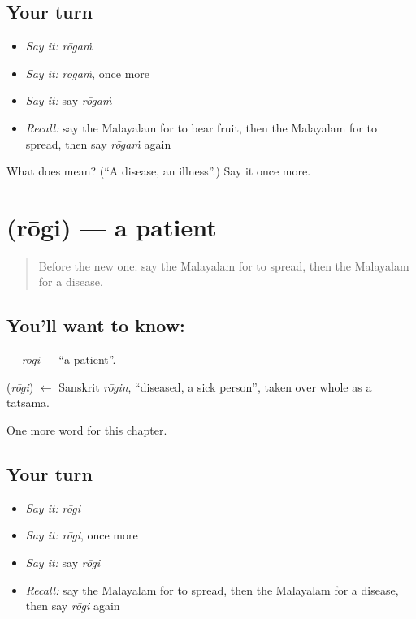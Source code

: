 \subsection*{Your turn}
\begin{itemize}
\raggedright
  \item \emph{Say it:} \emph{rōgaṁ}
  \item \emph{Say it:} \emph{rōgaṁ}, once more
  \item \emph{Say it:} say \emph{rōgaṁ}
  \item \emph{Recall:} say the Malayalam for to bear fruit, then the Malayalam for to spread, then say \emph{rōgaṁ} again
\end{itemize}

\begin{tcolorbox}[breakable,colback=teal!4,colframe=teal!35!black,title={Before you move on}]
What does  mean? (\textquotedblleft{}A disease, an illness\textquotedblright{}.) Say it once more.
\end{tcolorbox}
\section[\texorpdfstring{\ml{രോഗി} (rōgi)}{രോഗി (rōgi)}]{ (rōgi) — a patient}

\label{lesson:ML-C312-rogi}



\begin{quote}
Before the new one: say the Malayalam for to spread, then the Malayalam for a disease.
\end{quote}

\subsection*{You'll want to know: }
\textbf{} — \emph{rōgi} — \textquotedblleft{}a patient\textquotedblright{}.

\begin{cousinweb}
\textbf{} (\emph{rōgi}) $\leftarrow$ Sanskrit \emph{rōgin}, \textquotedblleft{}diseased, a sick person\textquotedblright{}, taken over whole as a tatsama.
\end{cousinweb}

\begin{grammarlens}[title={What you've built}]
One more word for this chapter.
\end{grammarlens}

\subsection*{Your turn}
\begin{itemize}
\raggedright
  \item \emph{Say it:} \emph{rōgi}
  \item \emph{Say it:} \emph{rōgi}, once more
  \item \emph{Say it:} say \emph{rōgi}
  \item \emph{Recall:} say the Malayalam for to spread, then the Malayalam for a disease, then say \emph{rōgi} again
\end{itemize}

